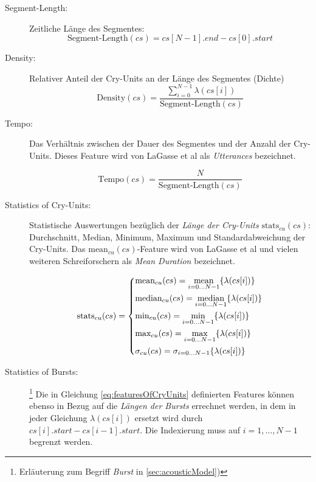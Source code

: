 \begin{description}
\item[Segment-Length: ] Zeitliche Länge des Segmentes:
\begin{equation}
\text{Segment-Length}(cs) = cs[N-1].end - cs[0].start
\label{eq:segment_length}
\end{equation}

\item[Density: ] Relativer Anteil der Cry-Units an der Länge des Segmentes (\glqq Dichte\grqq{})
\begin{equation}
\text{Density}(cs) = \frac{\sum_{i = 0}^{N-1} \lambda(cs[i])}{\text{Segment-Length}(cs)}
\end{equation}

\item[Tempo:] Das Verhältnis zwischen der Dauer des Segmentes und der Anzahl der Cry-Units. Dieses Feature wird von LaGasse et al \cite[S. 85]{parentalPerception} als \emph{Utterances} bezeichnet.

\begin{equation}
\text{Tempo}(cs) =  \frac{N}{\text{Segment-Length}(cs)}
\end{equation}

\item[Statistics of Cry-Units:] Statistische Auswertungen bezüglich der \emph{Länge der Cry-Units} $\text{stats}_{cu}(cs)$: Durchschnitt, Median, Minimum, Maximum und Standardabweichung der Cry-Units. Das $\text{mean}_{cu}(cs)$-Feature wird von LaGasse et al \cite[S. 85]{parentalPerception} und vielen weiteren Schreiforschern als \emph{Mean Duration} bezeichnet.

\begin{equation}
\text{stats}_{cu}(cs) = 
\begin{dcases}
\text{mean}_{cu}(cs) = \operatorname*{mean}_{i = 0 \ldots N-1}\{\lambda(cs[i])\} \\
\text{median}_{cu}(cs) = \operatorname*{median}_{i = 0 \ldots N-1}\{\lambda(cs[i])\} \\
\text{min}_{cu}(cs) = \operatorname*{min}_{i = 0 \ldots N-1}\{\lambda(cs[i])\} \\
\text{max}_{cu}(cs) = \operatorname*{max}_{i = 0 \ldots N-1}\{\lambda(cs[i])\} \\
\sigma_{cu}(cs) =  \sigma_{i = 0 \ldots N-1}\{\lambda(cs[i])\} 
\end{dcases}
\label{eq:featuresOfCryUnits}
\end{equation}

\item[Statistics of Bursts:]\footnote{Erläuterung zum Begriff \emph{Burst} in  \ref{sec:acousticModel})} Die in Gleichung \ref{eq:featuresOfCryUnits} definierten Features können ebenso in Bezug auf die \emph{Längen der Bursts} errechnet werden, in dem in jeder Gleichung $\lambda(cs[i])$ ersetzt wird durch $cs[i].start - cs[i-1].start$. Die Indexierung muss auf $i = 1 ,\ldots, N-1$ begrenzt werden.


\end{description}
